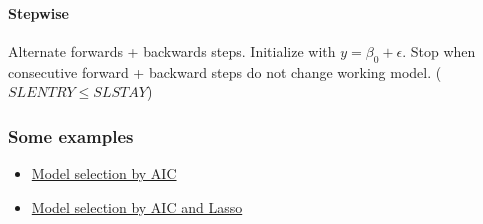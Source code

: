 \paragraph{Stepwise}
Alternate forwards + backwards steps.
Initialize with $y = \beta_0 + \epsilon$.
Stop when consecutive forward + backward steps do not change working model. ($SLENTRY \le SLSTAY$)

\subsubsection*{Some examples}

\begin{itemize}
	\item \href{https://tulane-math7360.github.io//slides/15-linear_model/linear_model.html#variable-selection}{Model selection by AIC}
	\item \href{https://tulane-math7360.github.io//slides/16-logistic_regression/logistic_regression.html#model-selection-by-aic}{Model selection by AIC and Lasso}
\end{itemize}












